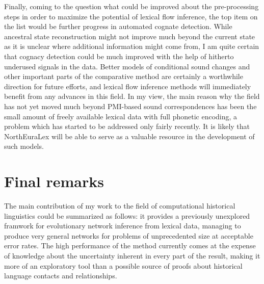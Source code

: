 Finally, coming to the question what could be improved about the pre-processing steps in order to maximize the potential of lexical flow inference, the top item on the list would be further progress in automated cognate detection. While ancestral state reconstruction might not improve much beyond the current state as it is unclear where additional information might come from, I am quite certain that cognacy detection could be much improved with the help of hitherto underused signals in the data. Better models of conditional sound changes and other important parts of the comparative method are certainly a worthwhile direction for future efforts, and lexical flow inference methods will immediately benefit from any advances in this field. In my view, the main reason why the field has not yet moved much beyond PMI-based sound correspondences has been the small amount of freely available lexical data with full phonetic encoding, a problem which has started to be addressed only fairly recently. It is likely that NorthEuraLex will be able to serve as a valuable resource in the development of such models.

\section{Final remarks}
The main contribution of my work to the field of computational historical linguistics could be summarized as follows: it provides a previously unexplored framwork for evolutionary network inference from lexical data, managing to produce very general networks for problems of unprecedented size at acceptable error rates. The high performance of the method currently comes at the expense of knowledge about the uncertainty inherent in every part of the result, making it more of an exploratory tool than a possible source of proofs about historical language contacts and relationships.

